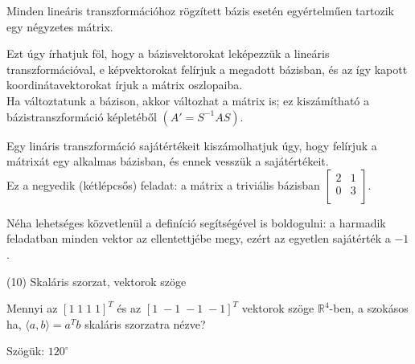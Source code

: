\begin{frame}
  \begin{tcolorbox}[title={Megoldások {\symking}}]
    Minden lineáris transzformációhoz rögzített bázis esetén egyértelműen tartozik egy négyzetes mátrix.\\
    \mmedskip
    
    Ezt úgy írhatjuk föl, hogy a bázisvektorokat leképezzük a lineáris transzformációval, e képvektorokat felírjuk a megadott bázisban, és az így kapott koordinátavektorokat írjuk a mátrix oszlopaiba.\\
    Ha változtatunk a bázison, akkor változhat a mátrix is; ez kiszámítható a bázistranszformáció képletéből $(A' = S^{-1}AS)$.\\
    \mmedskip
    
    Egy lináris transzformáció sajátértékeit kiszámolhatjuk úgy, hogy felírjuk a mátrixát egy alkalmas bázisban, és ennek vesszük a sajátértékeit.\\
    Ez a negyedik (kétlépcsős) feladat: a mátrix a triviális bázisban  $\begin{bmatrix} 
  				2 & 1 \\
  				0 & 3 \\
			\end{bmatrix}$.\\
    \mmedskip
    
    Néha lehetséges közvetlenül a definíció segítségével is boldogulni: a harmadik feladatban minden vektor az ellentettjébe megy, ezért az egyetlen sajátérték a $-1$.\\
  \end{tcolorbox}
\end{frame}


\begin{frame}[plain]
\begin{tcolorbox}[center, colback={myyellow}, coltext={black}, colframe={myyellow}]
    {\RHuge  (10) Skaláris szorzat, vektorok szöge }
    \mmedskip
\end{tcolorbox}
\end{frame}

\begin{frame}
  \begin{tcolorbox}[title={10/1. {\symknight}}]
    Mennyi az $[1 \; 1 \; 1 \; 1]^T$ és az $[1 \; -1 \; -1 \; -1]^T$ vektorok szöge $\mathbb{R}^4$-ben, a szokásos ha, ${\langle}a, b{\rangle} = a^Tb$ skaláris szorzatra nézve?

  \tcblower

    \mmedskip 
    
    Szögük: $120^{\circ}$

  \end{tcolorbox}
\end{frame}


